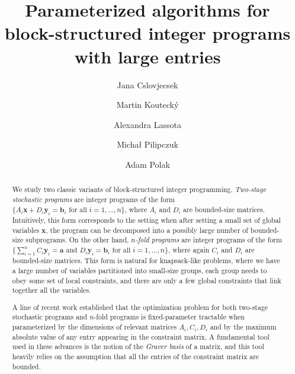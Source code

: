 \documentclass{article}
\author{Jana Cslovjecsek \and Martin Koutecký \and Alexandra Lassota \and Micha\l{} Pilipczuk \and Adam Polak}\date{}
\title{Parameterized algorithms for block-structured integer programs with large entries}
\newcommand{\tup}[1]{{\mathbf{#1}}}
\newcommand{\xx}{\tup x}
\newcommand{\yy}{\tup y}
\newcommand{\av}{\tup a}
\newcommand{\bb}{\tup b}
\begin{document}
\maketitle


\begin{abstract}
We study two classic variants of block-structured integer programming. {\em{Two-stage stochastic programs}} are integer programs of the form $\{A_i \xx + D_i \yy_i = \bb_i\textrm{ for all }i=1,\ldots,n\}$, where $A_i$ and $D_i$ are bounded-size matrices. Intuitively, this form corresponds to the setting when after setting a small set of global variables $\xx$, the program can be decomposed into a possibly large number of bounded-size subprograms.
On the other hand, {\em{$n$-fold programs}} are integer programs of the form $\{{\sum_{i=1}^n C_i\yy_i=\av} \textrm{ and } D_i\yy_i=\bb_i\textrm{ for all }i=1,\ldots,n\}$, where again $C_i$ and $D_i$ are bounded-size matrices. This form is natural for knapsack-like problems, where we have a large number of variables partitioned into small-size groups, each group needs to obey some set of local constraints, and there are only a few global constraints that link together all the variables.

A line of recent work established that the optimization problem for both two-stage stochastic programs and $n$-fold programs is fixed-parameter tractable when parameterized by the dimensions of relevant matrices $A_i,C_i,D_i$ and by the maximum absolute value of any entry appearing in the constraint matrix. A fundamental tool used in these advances is the notion of the {\em{Graver basis}} of a matrix, and this tool heavily relies on the assumption that all the entries of the constraint matrix are bounded.


\end{abstract}
\end{document}
